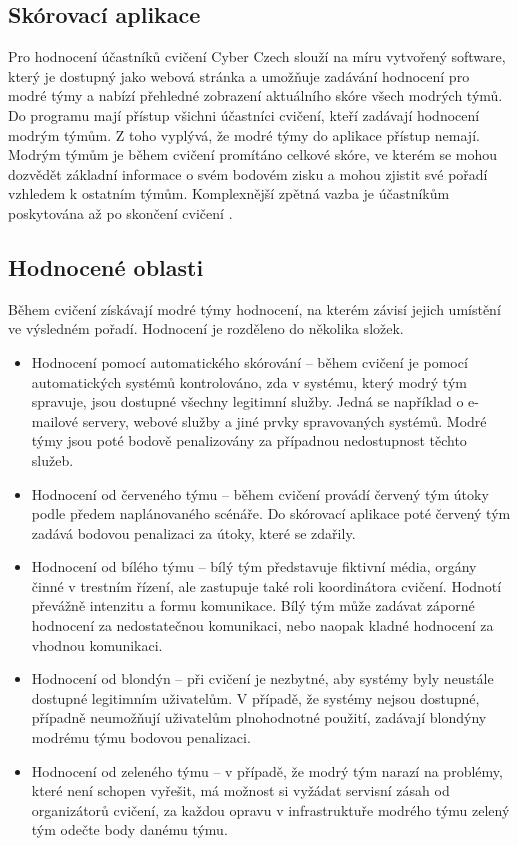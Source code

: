 \documentclass[
  digital, %
  twoside, %
  table,   %
  lof,     %
  lot,     %
]{fithesis3}
\begin{document}
\subsection{Skórovací aplikace}
Pro hodnocení účastníků cvičení Cyber Czech slouží na míru vytvořený software, který je dostupný jako webová stránka a umožňuje zadávání hodnocení pro modré týmy a nabízí přehledné zobrazení aktuálního skóre všech modrých týmů. Do programu mají přístup všichni účastníci cvičení, kteří zadávají hodnocení modrým týmům. Z toho vyplývá, že modré týmy do aplikace přístup nemají. Modrým týmům je během cvičení promítáno celkové skóre, ve kterém se mohou dozvědět základní informace o svém bodovém zisku a mohou zjistit své pořadí vzhledem k ostatním týmům. Komplexnější zpětná vazba je účastníkům poskytována až po skončení cvičení \cite{Vykopal2017TimelyExercises}.

\subsection{Hodnocené oblasti}
Během cvičení získávají modré týmy hodnocení, na kterém závisí jejich umístění ve výsledném pořadí. Hodnocení je rozděleno do několika složek.

\begin{itemize}
\item Hodnocení pomocí automatického skórování -- během cvičení je pomocí automatických systémů kontrolováno, zda v systému, který modrý tým spravuje, jsou dostupné všechny legitimní služby. Jedná se například o e-mailové servery, webové služby a jiné prvky spravovaných systémů. Modré týmy jsou poté bodově penalizovány za případnou nedostupnost těchto služeb.
\item Hodnocení od červeného týmu -- během cvičení provádí červený tým útoky podle předem naplánovaného scénáře. Do skórovací aplikace poté červený tým zadává bodovou penalizaci za útoky, které se zdařily.
\item Hodnocení od bílého týmu -- bílý tým představuje fiktivní média, orgány činné v trestním řízení, ale zastupuje také roli koordinátora cvičení. Hodnotí převážně intenzitu a formu komunikace. Bílý tým může zadávat záporné hodnocení za nedostatečnou komunikaci, nebo naopak kladné hodnocení za vhodnou komunikaci.
\item Hodnocení od blondýn -- při cvičení je nezbytné, aby systémy byly neustále dostupné legitimním uživatelům. V případě, že systémy nejsou dostupné, případně neumožňují uživatelům plnohodnotné použití, zadávají blondýny modrému týmu bodovou penalizaci.
\item Hodnocení od zeleného týmu -- v případě, že modrý tým narazí na problémy, které není schopen vyřešit, má možnost si vyžádat servisní zásah od organizátorů cvičení, za každou opravu v infrastruktuře modrého týmu zelený tým odečte body danému týmu.
\end{itemize}
\end{document}
